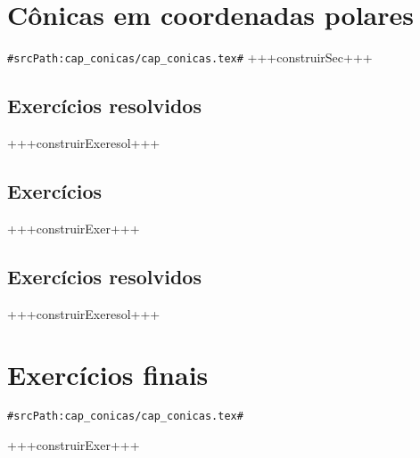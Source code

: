 \section{Cônicas em coordenadas polares}
\verb+#srcPath:cap_conicas/cap_conicas.tex#+
+++construirSec+++


\subsection*{Exercícios resolvidos}
+++construirExeresol+++


\subsection*{Exercícios}
+++construirExer+++


\subsection*{Exercícios resolvidos}
+++construirExeresol+++

\section{Exercícios finais}
\verb+#srcPath:cap_conicas/cap_conicas.tex#+

+++construirExer+++

